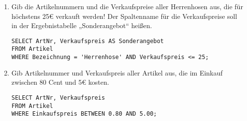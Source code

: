 \documentclass{lehramt-informatik-aufgabe}
\begin{document}
\begin{enumerate}

\item Gib die Artikelnummern und die Verkaufspreise aller Herrenhosen
aus, die für höchstens 25€ verkauft werden! Der Spaltenname für die
Verkaufspreise soll in der Ergebnistabelle „Sonderangebot“ heißen.

\begin{antwort}
\begin{verbatim}
SELECT ArtNr, Verkaufspreis AS Sonderangebot
FROM Artikel
WHERE Bezeichnung = 'Herrenhose' AND Verkaufspreis <= 25;
\end{verbatim}
\end{antwort}


\item Gib Artikelnummer und Verkaufspreis aller Artikel aus, die im
Einkauf zwischen 80 Cent und 5€ kosten.

\begin{antwort}
\begin{verbatim}
SELECT ArtNr, Verkaufspreis
FROM Artikel
WHERE Einkaufspreis BETWEEN 0.80 AND 5.00;
\end{verbatim}
\end{antwort}

\end{enumerate}
\end{document}
